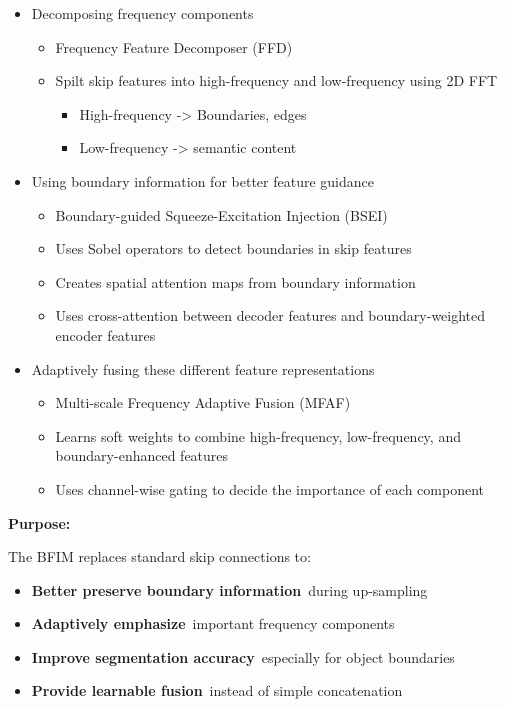 \begin{itemize}
\item
  Decomposing frequency components~

  \begin{itemize}
  \item
    Frequency Feature Decomposer (FFD)
  \item
    Spilt skip features into high-frequency and low-frequency using 2D
    FFT

    \begin{itemize}
    \item
      High-frequency -\textgreater{} Boundaries, edges
    \item
      Low-frequency -\textgreater{} semantic content
    \end{itemize}
  \end{itemize}
\item
  Using boundary information for better feature guidance

  \begin{itemize}
  \item
    Boundary-guided Squeeze-Excitation Injection (BSEI)
  \item
    Uses Sobel operators to detect boundaries in skip features
  \item
    Creates spatial attention maps from boundary information
  \item
    Uses cross-attention between decoder features and boundary-weighted
    encoder features
  \end{itemize}
\item
  Adaptively fusing these different feature representations

  \begin{itemize}
  \item
    Multi-scale Frequency Adaptive Fusion (MFAF)
  \item
    Learns soft weights to combine high-frequency, low-frequency, and
    boundary-enhanced features
  \item
    Uses channel-wise gating to decide the importance of each component
  \end{itemize}
\end{itemize}

\textbf{Purpose:}

The BFIM replaces standard skip connections to:

\begin{itemize}
\item
  \textbf{Better preserve boundary information}~during up-sampling
\item
  \textbf{Adaptively emphasize}~important frequency components
\item
  \textbf{Improve segmentation accuracy}~especially for object
  boundaries
\item
  \textbf{Provide learnable fusion}~instead of simple concatenation
\end{itemize}

